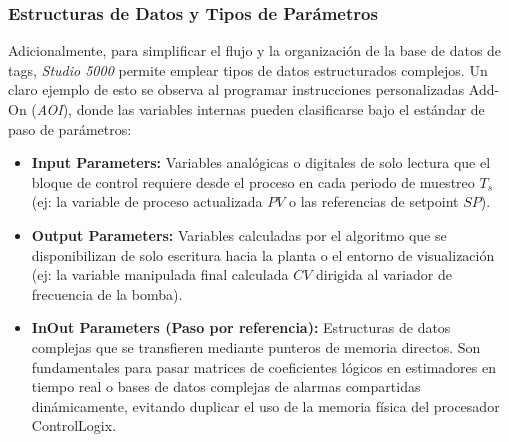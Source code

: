 \subsubsection{Estructuras de Datos y Tipos de Parámetros}
Adicionalmente, para simplificar el flujo y la organización de la base de datos de tags, \textit{Studio 5000} permite emplear tipos de datos estructurados complejos. Un claro ejemplo de esto se observa al programar instrucciones personalizadas Add-On (\textit{AOI}), donde las variables internas pueden clasificarse bajo el estándar de paso de parámetros:
\begin{itemize}
    \item \textbf{Input Parameters:} Variables analógicas o digitales de solo lectura que el bloque de control requiere desde el proceso en cada periodo de muestreo $T_s$ (ej: la variable de proceso actualizada $PV$ o las referencias de setpoint $SP$).
    \item \textbf{Output Parameters:} Variables calculadas por el algoritmo que se disponibilizan de solo escritura hacia la planta o el entorno de visualización (ej: la variable manipulada final calculada $CV$ dirigida al variador de frecuencia de la bomba).
    \item \textbf{InOut Parameters (Paso por referencia):} Estructuras de datos complejas que se transfieren mediante punteros de memoria directos. Son fundamentales para pasar matrices de coeficientes lógicos en estimadores en tiempo real o bases de datos complejas de alarmas compartidas dinámicamente, evitando duplicar el uso de la memoria física del procesador ControlLogix.
\end{itemize}
